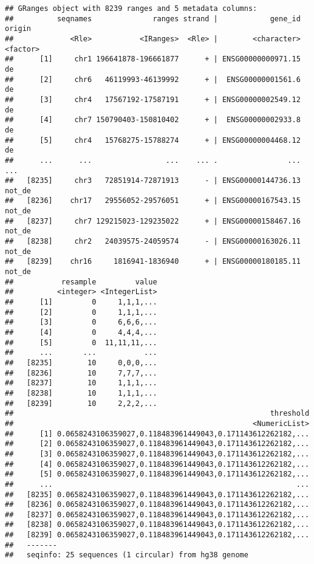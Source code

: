 \documentclass[
]{article}
\begin{document}
\begin{verbatim}
## GRanges object with 8239 ranges and 5 metadata columns:
##          seqnames              ranges strand |            gene_id   origin
##             <Rle>           <IRanges>  <Rle> |        <character> <factor>
##      [1]     chr1 196641878-196661877      + | ENSG00000000971.15       de
##      [2]     chr6   46119993-46139992      + |  ENSG00000001561.6       de
##      [3]     chr4   17567192-17587191      + | ENSG00000002549.12       de
##      [4]     chr7 150790403-150810402      + |  ENSG00000002933.8       de
##      [5]     chr4   15768275-15788274      + | ENSG00000004468.12       de
##      ...      ...                 ...    ... .                ...      ...
##   [8235]     chr3   72851914-72871913      - | ENSG00000144736.13   not_de
##   [8236]    chr17   29556052-29576051      + | ENSG00000167543.15   not_de
##   [8237]     chr7 129215023-129235022      + | ENSG00000158467.16   not_de
##   [8238]     chr2   24039575-24059574      - | ENSG00000163026.11   not_de
##   [8239]    chr16     1816941-1836940      + | ENSG00000180185.11   not_de
##           resample         value
##          <integer> <IntegerList>
##      [1]         0     1,1,1,...
##      [2]         0     1,1,1,...
##      [3]         0     6,6,6,...
##      [4]         0     4,4,4,...
##      [5]         0  11,11,11,...
##      ...       ...           ...
##   [8235]        10     0,0,0,...
##   [8236]        10     7,7,7,...
##   [8237]        10     1,1,1,...
##   [8238]        10     1,1,1,...
##   [8239]        10     2,2,2,...
##                                                           threshold
##                                                       <NumericList>
##      [1] 0.0658243106359027,0.118483961449043,0.171143612262182,...
##      [2] 0.0658243106359027,0.118483961449043,0.171143612262182,...
##      [3] 0.0658243106359027,0.118483961449043,0.171143612262182,...
##      [4] 0.0658243106359027,0.118483961449043,0.171143612262182,...
##      [5] 0.0658243106359027,0.118483961449043,0.171143612262182,...
##      ...                                                        ...
##   [8235] 0.0658243106359027,0.118483961449043,0.171143612262182,...
##   [8236] 0.0658243106359027,0.118483961449043,0.171143612262182,...
##   [8237] 0.0658243106359027,0.118483961449043,0.171143612262182,...
##   [8238] 0.0658243106359027,0.118483961449043,0.171143612262182,...
##   [8239] 0.0658243106359027,0.118483961449043,0.171143612262182,...
##   -------
##   seqinfo: 25 sequences (1 circular) from hg38 genome
\end{verbatim}
\end{document}
